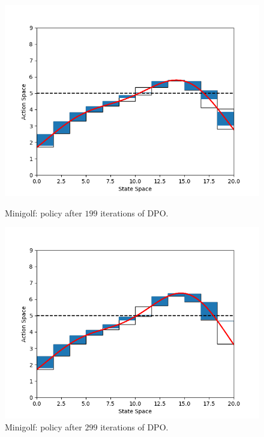 \begin{figure}[h!]
	\centering
	\begin{minipage}[t]{.48\columnwidth}
		\includegraphics[width=\textwidth]{plots/it199.png}
		\caption{Minigolf: policy after $199$ iterations of DPO.}
		\label{fig:mg199}
	\end{minipage}%
	\hfill
	\begin{minipage}[t]{.48\columnwidth}
		\includegraphics[width=\textwidth]{plots/it299.png}
		\caption{Minigolf: policy after $299$ iterations of DPO.}
		\label{fig:mg299}
	\end{minipage}
\end{figure}
